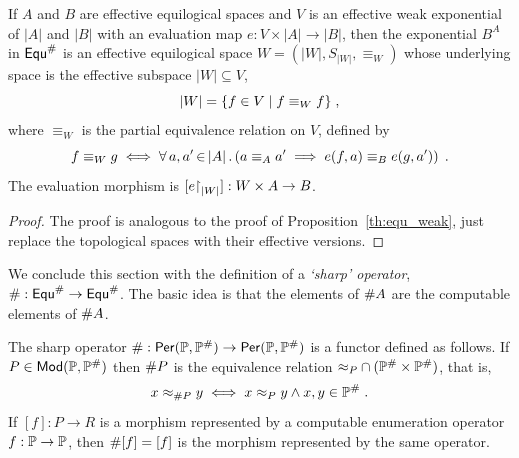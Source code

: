 \begin{proposition}
  \label{th:effequ_weak}%
  If $A$ and $B$ are effective equilogical spaces and $V$ is an
  effective weak exponential of $|A|$ and $|B|$ with an evaluation map
  $e: V \times |A| \to |B|$, then the exponential $B^A$ in $\mathsf{Equ}^{\#}$
  is an effective equilogical space $W = (|W|, S_{|W|}, \equiv_W)$
  whose underlying space is the effective subspace $|W| \subseteq V$,
  \begin{equation*}
    |W| = \{f \in V \mid f \equiv_W f\} \;,
  \end{equation*}
  where $\equiv_W$ is the partial equivalence relation on $V$, defined
  by
  \begin{equation*}
    f \equiv_W g \iff
    \forall\, a,a' \,{\in}\, |A|\,.\left(a \equiv_A a' \implies e(f,a) \equiv_B e(g,a')\right) \;.
  \end{equation*}
  The evaluation morphism is $[e{\restriction}_{|W|}]: W \times A \to B$.
\end{proposition}

\begin{proof}
  The proof is analogous to the proof of
  Proposition~\ref{th:equ_weak}, just replace the topological spaces
  with their effective versions.
\end{proof}

We conclude this section with the definition of a \emph{`sharp'
  operator}, $\#: \mathsf{Equ}^{\#} \to \mathsf{Equ}^{\#}$. The basic idea is that
the elements of $\# A$ are the computable elements of $\# A$.

\begin{definition}
  \label{def:sharp}%
  The sharp operator $\#: \mathsf{Per}(\mathbb{P},\mathbb{P}^{\#}) \to \mathsf{Per}(\mathbb{P},\mathbb{P}^{\#})$ is a functor
  defined as follows. If $P \in \mathsf{Mod}(\mathbb{P},\mathbb{P}^{\#})$ then $\# P$ is the
  equivalence relation ${\approx_P} \cap (\mathbb{P}^{\#} \times \mathbb{P}^{\#})$, that 
  is,
  \begin{equation*}
    x \approx_{\# P} y \iff
    x \approx_P y \land x, y \in \mathbb{P}^{\#} \;.
  \end{equation*}
  If $[f]: P \to R$ is a morphism represented by a computable
  enumeration operator $f: \mathbb{P} \to \mathbb{P}$, then $\# [f] = [f]$ is
  the morphism represented by the same operator.
\end{definition}


